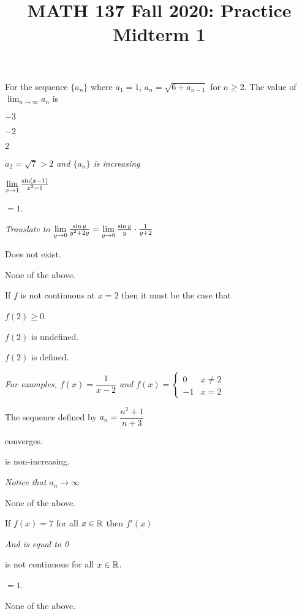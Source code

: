 \documentclass{agony}
\title{MATH 137 Fall 2020: Practice Midterm 1}
\begin{document}
\thispagestyle{firstpage}

\textbf{\thetitle}


\question For the sequence $\{a_n\}$ where $a_1=1$, $a_n=\sqrt{6+a_{n-1}}$ for $n \geq 2$.
The value of $\lim_{n\to\infty} a_n$ is
\begin{choices}
  \item $-3$
  \item $-2$
  \item $2$
  \item {}
  \emph{$a_2=\sqrt{7}>2$ and $\{a_n\}$ is increasing}
\end{choices}

\question $\lim\limits_{x\to1} \frac{\sin(x-1)}{x^2-1}$
\begin{choices}
  \item $=1$.
  \item {}
  \emph{Translate to $\lim\limits_{y\to0}\frac{\sin y}{y^2+2y}=\lim\limits_{y\to0}\frac{\sin y}{y}\cdot\frac{1}{y+2}$}
  \item Does not exist.
  \item None of the above.
\end{choices}

\question If $f$ is not continuous at $x=2$ then it must be the case that
\begin{choices}
  \item $f(2) \geq 0$.
  \item $f(2)$ is undefined.
  \item $f(2)$ is defined.
  \item {}
  \emph{For examples, $f(x)=\dfrac{1}{x-2}$ and $f(x)=\begin{cases}
        0 & x \neq 2 \\ -1 & x = 2
      \end{cases}$}
\end{choices}

\question The sequence defined by $a_n = \dfrac{n^2+1}{n+3}$
\begin{choices}
  \item converges.
  \item is non-increasing.
  \item {}
  \emph{Notice that $a_n\to\infty$}
  \item None of the above.
\end{choices}

\question If $f(x)=7$ for all $x \in \mathbb{R}$ then $f'(x)$
\begin{choices}
  \item {} \emph{And is equal to 0}
  \item is not continuous for all $x \in \mathbb{R}$.
  \item $= 1$.
  \item None of the above.
\end{choices}
\end{document}
